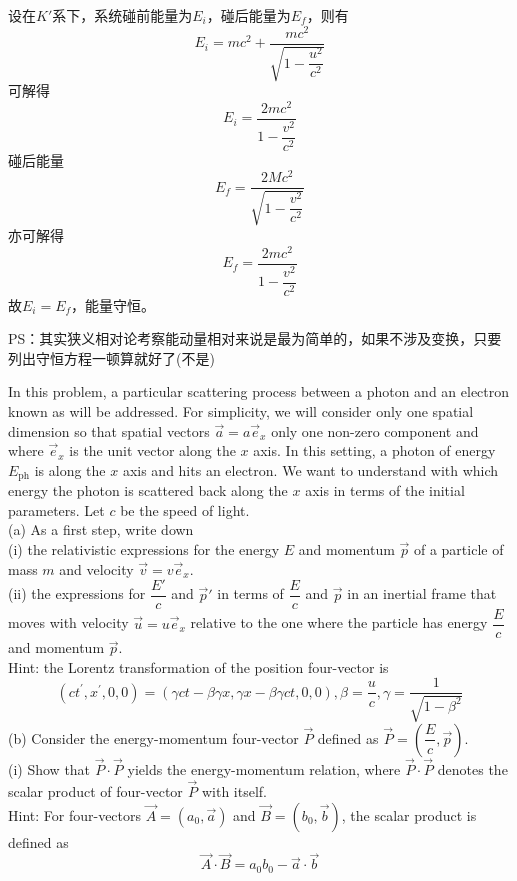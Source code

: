 \begin{solution}
    设在$K'$系下，系统碰前能量为$E_i$，碰后能量为$E_f$，则有
    \[E_i=mc^{2}+\frac{mc^{2}}{\sqrt{1-\dfrac{u^{2}}{c^{2}}}}\]
    可解得
    \[E_i=\frac{2mc^{2}}{1-\dfrac{v^2}{c^2}}\]
    碰后能量
    \[E_f=\frac{2Mc^{2}}{\sqrt{1-\dfrac{v^{2}}{c^{2}}}}\]
    亦可解得
    \[E_f=\frac{2mc^{2}}{1-\dfrac{v^2}{c^2}}\]
    故$E_i=E_f$，能量守恒。
    
    PS：其实狭义相对论考察能动量相对来说是最为简单的，如果不涉及变换，只要列出守恒方程一顿算就好了(不是)
\end{solution}

\begin{solution}
	In this problem, a particular scattering process between a photon and an electron known as  will be addressed. For simplicity, we will consider only one spatial dimension so that spatial vectors $\vec{a}=a\vec{e}_x$   only one non-zero component and where $\vec{e}_x$ is the unit vector along the $x$ axis. In this setting, a photon of energy $E_\mathrm{ph}$ is  along the $x$ axis and hits an electron. We want to understand with which energy the photon is scattered back along the $x$ axis in terms of the initial parameters. Let $c$ be the speed of light.
	\\(a) As a first step, write down
	\\\hspace*{2em}(i) the relativistic expressions for the energy $E$ and momentum $\vec{p}$ of a particle of mass $m$ and velocity $\vec{v} = v\vec{e}_x$.
	\\\hspace*{2em}(ii) the expressions for $\dfrac{E'}{c}$ and $\vec{p}'$ in terms of $\dfrac{E}{c}$ and $\vec{p}$ in an inertial frame that moves with
	velocity $\vec{u}=u\vec{e}_{x}$ relative to the one where the particle has energy $\dfrac{E}{c}$ and momentum $\vec{p}$.\\
	Hint: the Lorentz transformation of the position four-vector is \[(ct^{\prime},x^{\prime},0,0)=(\gamma ct-\beta\gamma x,\gamma x-\beta \gamma ct, 0, 0), \beta = \dfrac{u}{c}, \gamma = \dfrac{1}{\sqrt {1- \beta ^2}}\]
	(b) Consider the energy-momentum four-vector $\vec{P}$ defined as $\vec{P}=(\dfrac{E}{c},\vec{p})$.\\
	\hspace*{2em}(i) Show that $\vec{P}\cdot\vec{P}$ yields the energy-momentum relation, where $\vec{P}\cdot\vec{P}$ denotes the scalar product of four-vector $\vec{P}$ with itself.\\ Hint: For four-vectors $\vec{A}=(a_0,\vec{a})$ and $\vec{B}=(b_0,\vec{b})$, the scalar product is defined as  \[\vec{A}\cdot\vec{B}=a_{0}b_{0}-\vec{a}\cdot\vec{b}\]

\end{solution}
